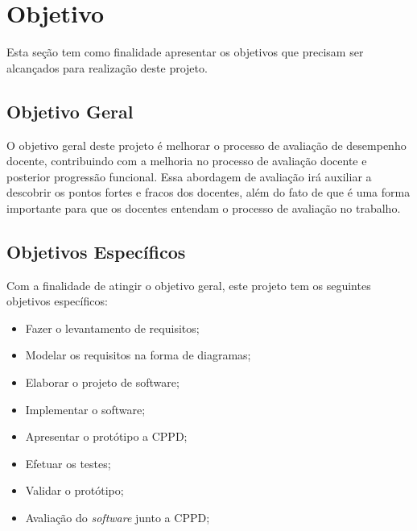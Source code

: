 \section{Objetivo} \label{Objetivo}
    Esta seção tem como finalidade apresentar os objetivos que precisam ser alcançados  para realização deste  projeto.

\subsection{Objetivo Geral} \label{Objetivo Geral}
    O objetivo geral deste projeto é melhorar o processo de avaliação de desempenho docente, contribuindo com a melhoria no processo de avaliação docente e posterior progressão funcional. Essa abordagem de avaliação irá auxiliar a descobrir os pontos fortes e fracos dos docentes, além do fato de que é uma forma importante para que os docentes entendam o processo de avaliação no trabalho. 


\subsection{Objetivos Específicos} \label{Objetivos Específicos}
    Com a finalidade de atingir o objetivo geral, este projeto tem os seguintes objetivos específicos:

    
\begin{itemize}
    \item {Fazer o levantamento de requisitos;}
    \item {Modelar os requisitos na forma de diagramas;}
    \item {Elaborar o projeto de software;}
    \item {Implementar o software;}
    \item {Apresentar o protótipo a CPPD;}
    \item {Efetuar os testes;}
    \item {Validar o protótipo;}
    \item {Avaliação do \textit{software} junto a CPPD;}

\end{itemize}




